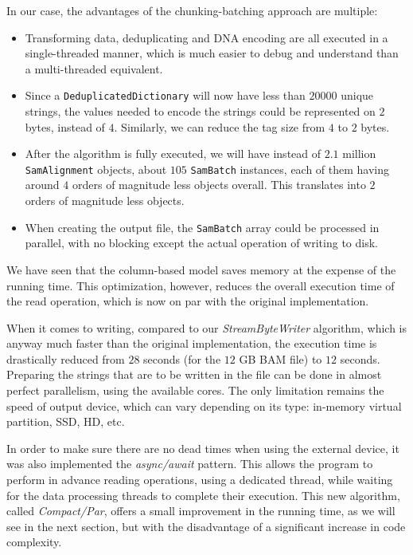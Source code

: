 \documentclass[a4paper,twoside]{article}
\begin{document}
In our case, the advantages of the chunking-batching approach are multiple:
\begin{itemize}
\item Transforming data, deduplicating and DNA encoding are all executed in a single-threaded manner, which is much easier to debug and understand than a multi-threaded equivalent.

\item Since a {\texttt{DeduplicatedDictionary}} will now have less than $20000$ unique strings, the values needed to encode the strings could be represented on $2$ bytes, instead of $4$.
Similarly, we can reduce the tag size from $4$ to $2$ bytes.

\item After the algorithm is fully executed,  we will have instead of $2.1$ million {\texttt{SamAlignment}} objects, about $105$ {\texttt{SamBatch}} instances, each of them having around $4$ orders of magnitude less objects overall.
This translates into $2$ orders of magnitude less objects.

\item When creating the output file, the {\texttt{SamBatch}} array could be processed in parallel, with no blocking except the actual operation of writing to disk.
\end{itemize}

We have seen that the column-based model saves memory at the expense of the running time.
This optimization, however, reduces the overall execution time of the read operation, which is now on par with the original implementation.

When it comes to writing, compared to our {\textit{StreamByteWriter} } algorithm, which is anyway much faster than the original implementation, the execution time is drastically reduced from $28$ seconds (for the $12$ GB BAM file) to $12$ seconds.
Preparing the strings that are to be written in the file can be done in almost perfect parallelism, using the available cores.
The only limitation remains the speed of output device, which can vary depending on its type: in-memory virtual partition, SSD, HD, etc.

In order to make sure there are no dead times when using the external device, it was also implemented the {\textit{async/await}} pattern. This allows the program to perform in advance reading operations, using a dedicated thread, while waiting for the data processing threads to complete their execution.
This new algorithm, called {\textit{Compact/Par}}, offers a small improvement in the running time, as we will see in the next section, but with the disadvantage of a significant increase in code complexity.
\end{document}
